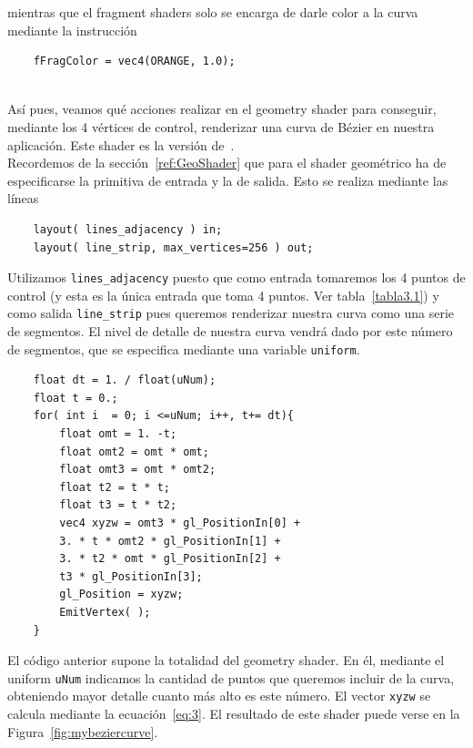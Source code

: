 mientras que el fragment shaders solo se encarga de darle color a la curva
mediante la instrucción

\begin{verbatim}
    fFragColor = vec4(ORANGE, 1.0);
\end{verbatim}\\

Así pues, veamos qué acciones realizar en el geometry shader para conseguir,
mediante los 4 vértices de control, renderizar una curva de Bézier en nuestra
aplicación. Este shader es la versión de~\citet{Bailey}. \\

Recordemos de la sección~\ref{ref:GeoShader} que para el shader geométrico ha de
especificarse la primitiva de entrada y la de salida. Esto se realiza mediante
las líneas

\begin{verbatim}
    layout( lines_adjacency ) in;
    layout( line_strip, max_vertices=256 ) out;
\end{verbatim}

Utilizamos \verb|lines_adjacency| puesto que como entrada tomaremos los 4 puntos
de control (y esta es la única entrada que toma 4 puntos. Ver
tabla~\ref{tabla3.1}) y como salida \verb|line_strip| pues queremos renderizar
nuestra curva como una serie de segmentos. El nivel de detalle de nuestra curva
vendrá dado por este número de segmentos, que se especifica mediante una
variable \verb|uniform|.

\begin{verbatim}
    float dt = 1. / float(uNum);
    float t = 0.;
    for( int i  = 0; i <=uNum; i++, t+= dt){
        float omt = 1. -t;
        float omt2 = omt * omt;
        float omt3 = omt * omt2;
        float t2 = t * t;
        float t3 = t * t2;
        vec4 xyzw = omt3 * gl_PositionIn[0] +
        3. * t * omt2 * gl_PositionIn[1] +
        3. * t2 * omt * gl_PositionIn[2] +
        t3 * gl_PositionIn[3];
        gl_Position = xyzw;
        EmitVertex( );
    }
\end{verbatim}

El código anterior supone la totalidad del geometry shader. En él, mediante el
uniform \verb|uNum| indicamos la cantidad de puntos que queremos incluir de la
curva, obteniendo mayor detalle cuanto más alto es este número. El vector
\verb|xyzw| se calcula mediante la ecuación~\eqref{eq:3}. El resultado de este
shader puede verse en la Figura~\ref{fig:mybeziercurve}.

